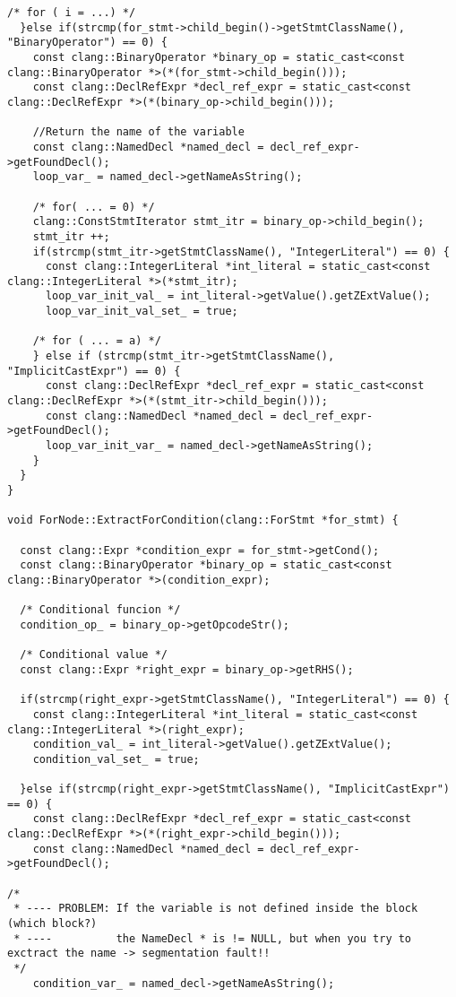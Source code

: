 \documentclass[a4paper,11pt,twoside]{book}
\begin{document}
\begin{lstlisting}[language=CCC, caption=pragma\_handler/ForNode.cpp]
  /* for ( i = ...) */
  }else if(strcmp(for_stmt->child_begin()->getStmtClassName(), "BinaryOperator") == 0) {
    const clang::BinaryOperator *binary_op = static_cast<const clang::BinaryOperator *>(*(for_stmt->child_begin())); 
    const clang::DeclRefExpr *decl_ref_expr = static_cast<const clang::DeclRefExpr *>(*(binary_op->child_begin()));
    
    //Return the name of the variable
    const clang::NamedDecl *named_decl = decl_ref_expr->getFoundDecl();
    loop_var_ = named_decl->getNameAsString();
    
    /* for( ... = 0) */
    clang::ConstStmtIterator stmt_itr = binary_op->child_begin();
    stmt_itr ++;
    if(strcmp(stmt_itr->getStmtClassName(), "IntegerLiteral") == 0) {
      const clang::IntegerLiteral *int_literal = static_cast<const clang::IntegerLiteral *>(*stmt_itr);
      loop_var_init_val_ = int_literal->getValue().getZExtValue();      
      loop_var_init_val_set_ = true;      

    /* for ( ... = a) */
    } else if (strcmp(stmt_itr->getStmtClassName(), "ImplicitCastExpr") == 0) {
      const clang::DeclRefExpr *decl_ref_expr = static_cast<const clang::DeclRefExpr *>(*(stmt_itr->child_begin()));
      const clang::NamedDecl *named_decl = decl_ref_expr->getFoundDecl();
      loop_var_init_var_ = named_decl->getNameAsString();
    }
  }
}

void ForNode::ExtractForCondition(clang::ForStmt *for_stmt) {

  const clang::Expr *condition_expr = for_stmt->getCond();
  const clang::BinaryOperator *binary_op = static_cast<const clang::BinaryOperator *>(condition_expr);
  
  /* Conditional funcion */
  condition_op_ = binary_op->getOpcodeStr();

  /* Conditional value */
  const clang::Expr *right_expr = binary_op->getRHS();

  if(strcmp(right_expr->getStmtClassName(), "IntegerLiteral") == 0) {
    const clang::IntegerLiteral *int_literal = static_cast<const clang::IntegerLiteral *>(right_expr);
    condition_val_ = int_literal->getValue().getZExtValue();
    condition_val_set_ = true;

  }else if(strcmp(right_expr->getStmtClassName(), "ImplicitCastExpr") == 0) {
    const clang::DeclRefExpr *decl_ref_expr = static_cast<const clang::DeclRefExpr *>(*(right_expr->child_begin()));
    const clang::NamedDecl *named_decl = decl_ref_expr->getFoundDecl();

/*
 * ---- PROBLEM: If the variable is not defined inside the block (which block?)
 * ----          the NameDecl * is != NULL, but when you try to exctract the name -> segmentation fault!!
 */
    condition_var_ = named_decl->getNameAsString();
  

\end{lstlisting}
\end{document}
